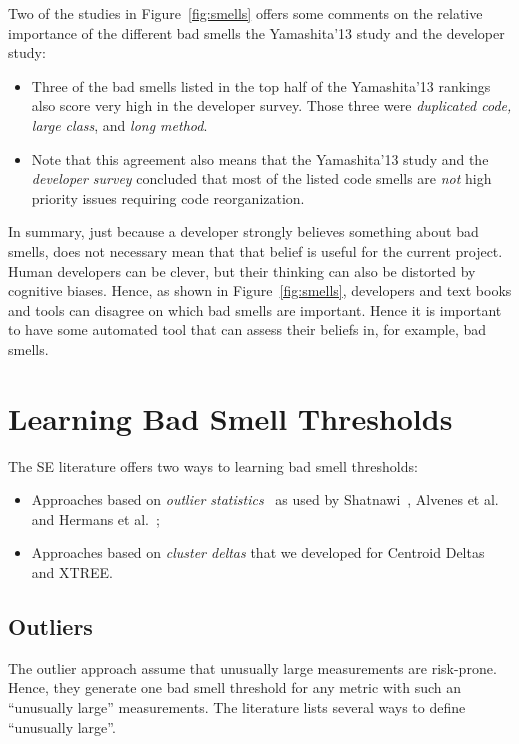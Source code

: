 \documentclass{sig-alternate}
\newcommand{\fig}[1]{Figure~\ref{fig:#1}}
\begin{document}
Two of the studies in \fig{smells} offers some comments on the relative importance
of the different bad smells the   Yamashita'13 study and the developer study:
    \begin{itemize}
        \item Three of the bad smells listed in the top half of the Yamashita'13 rankings also score very high in the developer survey. Those three were {\em duplicated code, large class}, 
        and {\em long method}.
        \item
 Note that this agreement also means that the
  Yamashita'13 study and the {\em developer survey}   concluded
        that most of the  listed code smells are {\em not} high priority issues
        requiring code reorganization. 
 \end{itemize} 
In summary, just because a developer strongly believes something
about bad smells, does
not necessary mean that that belief is useful for the current project.
Human developers can be clever, but their thinking can also be distorted
by cognitive biases.
Hence, as shown in \fig{smells}, developers and text books and tools 
can disagree on which bad smells are important.
Hence it is important to have some automated tool
that can assess their beliefs in, for example,
bad smells.  
 

\section{Learning Bad Smell Thresholds}
The SE literature offers  two ways to 
learning bad smell thresholds:
\begin{itemize}
    \item Approaches based on {\em outlier statistics}~\cite{erni96,bender99}
    as used by Shatnawi~\cite{Shatnawi10}, Alvenes et al.~\cite{Alves2010}
    and Hermans et al.~\cite{hermans15};
    \item  Approaches based on {\em cluster deltas} that we developed
    for   Centroid Deltas~\cite{me12c} and XTREE.
\end{itemize}
\subsection{  Outliers}

The outlier approach assume that unusually large measurements are risk-prone.
Hence, they generate one bad smell threshold for any metric
with such an ``unusually large'' measurements. 
The literature lists several ways to define ``unusually large''.
\end{document}
